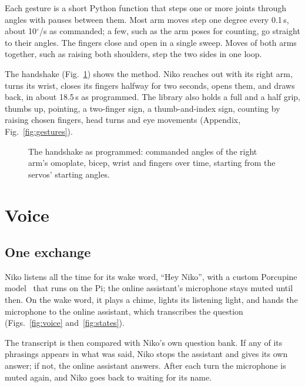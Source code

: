 \documentclass[11pt]{article}
\begin{document}
Each gesture is a short Python function that steps one or more joints through angles with pauses between them. Most arm moves step one degree every 0.1\,s, about 10$^\circ$/s as commanded; a few, such as the arm poses for counting, go straight to their angles. The fingers close and open in a single sweep. Moves of both arms together, such as raising both shoulders, step the two sides in one loop.

The handshake (Fig.~\ref{fig:handshake}) shows the method. Niko reaches out with its right arm, turns its wrist, closes its fingers halfway for two seconds, opens them, and draws back, in about 18.5\,s as programmed. The library also holds a full and a half grip, thumbs up, pointing, a two-finger sign, a thumb-and-index sign, counting by raising chosen fingers, head turns and eye movements (Appendix, Fig.~\ref{fig:gestures}).

\begin{figure}[htbp]
  \centering
  \caption{The handshake as programmed: commanded angles of the right arm's omoplate, bicep, wrist and fingers over time, starting from the servos' starting angles.}
  \label{fig:handshake}
\end{figure}

\section{Voice}
\label{sec:voice}

\subsection{One exchange}

Niko listens all the time for its wake word, ``Hey Niko'', with a custom Porcupine model~\cite{porcupine} that runs on the Pi; the online assistant's microphone stays muted until then. On the wake word, it plays a chime, lights its listening light, and hands the microphone to the online assistant, which transcribes the question (Figs.~\ref{fig:voice} and~\ref{fig:states}).

The transcript is then compared with Niko's own question bank. If any of its phrasings appears in what was said, Niko stops the assistant and gives its own answer; if not, the online assistant answers. After each turn the microphone is muted again, and Niko goes back to waiting for its name.
\end{document}
